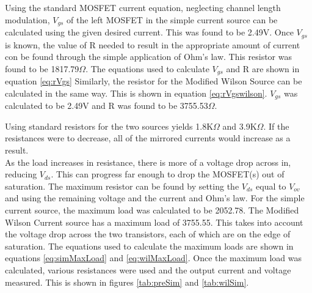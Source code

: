 Using the standard MOSFET current equation, neglecting channel length modulation, $V_{gs}$ of the left MOSFET in the simple current source can be calculated using the given desired current.
This was found to be 2.49V. 
Once $V_{gs}$ is known, the value of R needed to result in the appropriate amount of current con be found through the simple application of Ohm's law. This resistor was found to be 1817.79$\Omega$. 
The equations used to calculate $V_{gs}$ and R are shown in equation \ref{eq:rVgs}
Similarly, the resistor for the Modified Wilson Source can be calculated in the same way. This is shown in equation \ref{eq:rVgswilson}. $V_{gs}$ was calculated to be 2.49V and R was found to be 3755.53$\Omega$. 


Using standard resistors for the two sources yields 1.8K$\Omega$ and 3.9K$\Omega$. If the resistances were to decrease, all of the mirrored currents would increase as a result. 
\\
As the load increases in resistance, there is more of a voltage drop across in, reducing $V_{ds}$. This can progress far enough to drop the MOSFET(s) out of saturation. 
The maximum resistor can be found by setting the $V_{ds}$ equal to $V_{ov}$ and using the remaining voltage and the current and Ohm's law. For the simple current source, the maximum load was calculated to be 2052.78\ohm. 
The Modified Wilson Current source has a maximum load of 3755.55\ohm. This takes into account the voltage drop across the two transistors, each of which are on the edge of saturation. The equations used to calculate the maximum loads are shown in equations \ref{eq:simMaxLoad} and \ref{eq:wilMaxLoad}. 
Once the maximum load was calculated, various resistances were used and the output current and voltage measured. This is shown in figures \ref{tab:preSim} and \ref{tab:wilSim}. 

